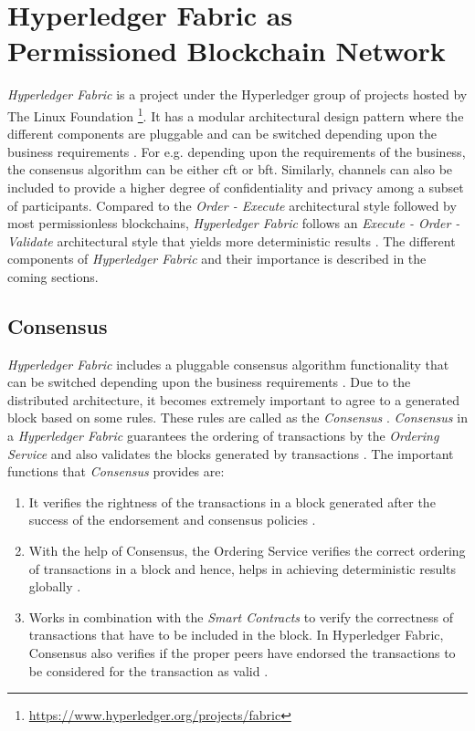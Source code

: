 \documentclass[
  a4paper,  %
  twoside,  %
  bibliography=totoc,
  headsepline,
  cleardoublepage=empty,
  parskip=half,
  draft=false
]{scrbook}
\begin{document}
\section{Hyperledger Fabric as Permissioned Blockchain Network}
\textit{Hyperledger Fabric} is a project under the Hyperledger group of projects hosted by The Linux Foundation \footnote{\url{https://www.hyperledger.org/projects/fabric}}. It has a modular architectural design pattern where the different components are pluggable and can be switched depending upon the business requirements \cite{HF}. For e.g. depending upon the requirements of the business, the consensus algorithm can be either \gls{cft} or \gls{bft}. Similarly, channels can also be included to provide a higher degree of confidentiality and privacy among a subset of participants. Compared to the \textit{Order - Execute} architectural style followed by most permissionless blockchains, \textit{Hyperledger Fabric} follows an \textit{Execute - Order - Validate} architectural style that yields more deterministic results \cite{HF}. The different components of \textit{Hyperledger Fabric} and their importance is described in the coming sections.
\subsection{Consensus}
\textit{Hyperledger Fabric} includes a pluggable consensus algorithm functionality that can be switched depending upon the business requirements \cite{Con}\cite{HW1}. Due to the distributed architecture, it becomes extremely important to agree to a generated block based on some rules. These rules are called as the \textit{Consensus} \cite{HFO}. \textit{Consensus} in a \textit{Hyperledger Fabric} guarantees the ordering of transactions by the \textit{Ordering Service} and also validates the blocks generated by transactions \cite{HW1}. The important functions that \textit{Consensus} provides are:
\begin{enumerate}
\item It verifies the rightness of the transactions in a block generated after the success of the endorsement and consensus policies \cite{HW1}.
\item With the help of Consensus, the Ordering Service verifies the correct ordering of transactions in a block and hence, helps in achieving deterministic results globally \cite{HF}. 
\item Works in combination with the \textit{Smart Contracts} to verify the correctness of transactions that have to be included in the block. In Hyperledger Fabric, Consensus also verifies if the proper peers have endorsed the transactions to be considered for the transaction as valid \cite{HF}.
\end{enumerate}
\end{document}
